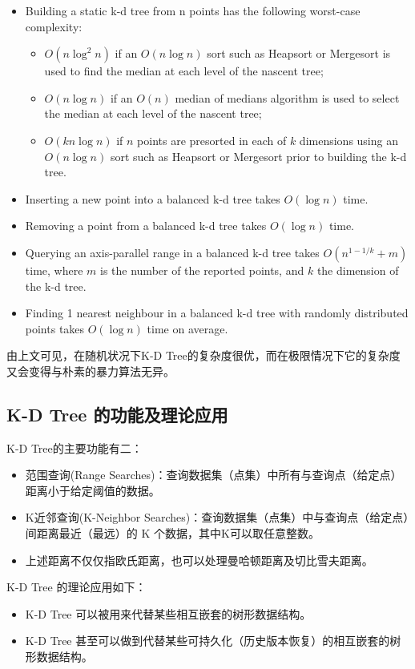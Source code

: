 \documentclass{article}
\begin{document}
\begin{itemize}
    \item {Building a static k-d tree from n points has the following worst-case complexity:\cite{ref5}}
        \begin{itemize}
            \item $O(n\log^2n)$ if an $O(n \log n)$ sort such as Heapsort or Mergesort is used to find the median at each level of the nascent tree;
            \item $O(n\log n)$ if an $O(n)$ median of medians algorithm is used to select the median at each level of the nascent tree;
            \item $O(kn \log n)$ if $n$ points are presorted in each of $k$ dimensions using an $O(n \log n)$ sort such as Heapsort or Mergesort prior to building the k-d tree.
        \end{itemize}
    \item {Inserting a new point into a balanced k-d tree takes $O(\log n)$ time.}
    \item {Removing a point from a balanced k-d tree takes $O(\log n)$ time.}
    \item {Querying an axis-parallel range in a balanced k-d tree takes $O(n^{1−1/k}+m)$ time, where $m$ is the number of the reported points, and $k$ the dimension of the k-d tree.\cite{ref7}}
    \item {Finding 1 nearest neighbour in a balanced k-d tree with randomly distributed points takes $O(\log n)$ time on average.\cite{ref6}}
\end{itemize}
由上文可见，在随机状况下K-D Tree的复杂度很优，而在极限情况下它的复杂度又会变得与朴素的暴力算法无异。

\subsection{K-D Tree 的功能及理论应用}
K-D Tree的主要功能有二：\par
\begin{itemize}
    \item {范围查询(Range Searches)：查询数据集（点集）中所有与查询点（给定点）距离小于给定阈值的数据。}
    \item {K近邻查询(K-Neighbor Searches)：查询数据集（点集）中与查询点（给定点）间距离最近（最远）的 K 个数据，其中K可以取任意整数。}
    \item {上述距离不仅仅指欧氏距离，也可以处理曼哈顿距离及切比雪夫距离。}
\end{itemize} \par
K-D Tree 的理论应用如下：\par
\begin{itemize}
    \item {K-D Tree 可以被用来代替某些相互嵌套的树形数据结构。}
    \item {K-D Tree 甚至可以做到代替某些可持久化（历史版本恢复）的相互嵌套的树形数据结构。}
\end{itemize}
\end{document}
